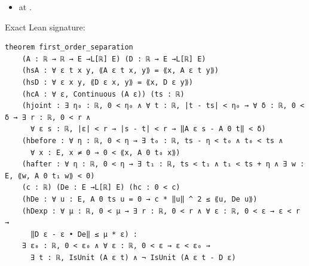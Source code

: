 \begin{theorem}[bp-102]
\begin{itemize}
\item \texttt{} at \texttt{}.
\end{itemize}
\par Exact Lean signature:
\begin{verbatim}
theorem first_order_separation
    (A : ℝ → ℝ → E →L[ℝ] E) (D : ℝ → E →L[ℝ] E)
    (hsA : ∀ ε t x y, ⟪A ε t x, y⟫ = ⟪x, A ε t y⟫)
    (hsD : ∀ ε x y, ⟪D ε x, y⟫ = ⟪x, D ε y⟫)
    (hcA : ∀ ε, Continuous (A ε)) (ts : ℝ)
    (hjoint : ∃ η₀ : ℝ, 0 < η₀ ∧ ∀ t : ℝ, |t - ts| < η₀ → ∀ δ : ℝ, 0 < δ → ∃ r : ℝ, 0 < r ∧
      ∀ ε s : ℝ, |ε| < r → |s - t| < r → ‖A ε s - A 0 t‖ < δ)
    (hbefore : ∀ η : ℝ, 0 < η → ∃ t₀ : ℝ, ts - η < t₀ ∧ t₀ < ts ∧
      ∀ x : E, x ≠ 0 → 0 < ⟪x, A 0 t₀ x⟫)
    (hafter : ∀ η : ℝ, 0 < η → ∃ t₁ : ℝ, ts < t₁ ∧ t₁ < ts + η ∧ ∃ w : E, ⟪w, A 0 t₁ w⟫ < 0)
    (c : ℝ) (De : E →L[ℝ] E) (hc : 0 < c)
    (hDe : ∀ u : E, A 0 ts u = 0 → c * ‖u‖ ^ 2 ≤ ⟪u, De u⟫)
    (hDexp : ∀ μ : ℝ, 0 < μ → ∃ r : ℝ, 0 < r ∧ ∀ ε : ℝ, 0 < ε → ε < r →
      ‖D ε - ε • De‖ ≤ μ * ε) :
    ∃ ε₀ : ℝ, 0 < ε₀ ∧ ∀ ε : ℝ, 0 < ε → ε < ε₀ →
      ∃ t : ℝ, IsUnit (A ε t) ∧ ¬ IsUnit (A ε t - D ε)
\end{verbatim}
\end{theorem}

